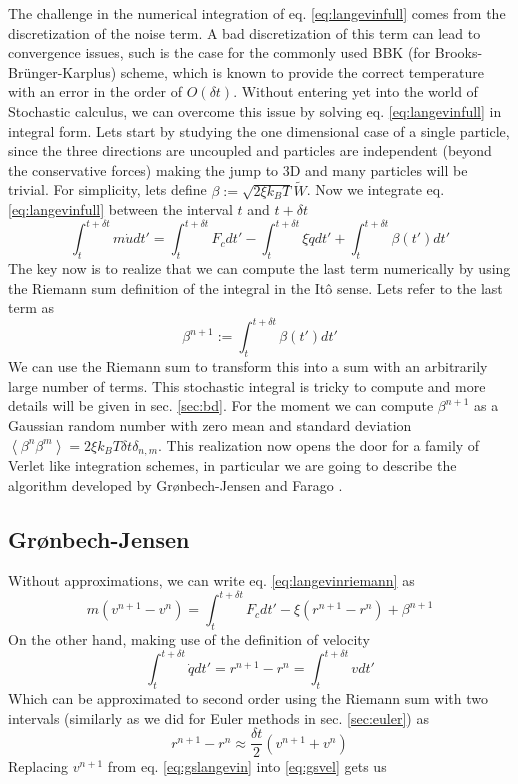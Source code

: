 \documentclass[ twoside,openright,titlepage,numbers=noenddot,%
headinclude,footinclude,cleardoublepage=empty,abstract=on,
BCOR=5mm,paper=a4,fontsize=11pt, dvipsnames
]{scrreprt}
\newcommand{\dt}{\delta t}
\newcommand{\kT}{k_B T}
\newcommand{\ppos}{q}
\newcommand{\pvel}{u}
\begin{document}
The challenge in the numerical integration of eq. \eqref{eq:langevinfull} comes from the discretization of the noise term.
A bad discretization of this term can lead to convergence issues, such is the case for the commonly used BBK (for Brooks-Brünger-Karplus) scheme\cite{Brunger1984}, which is known to provide the correct temperature with an error in the order of $O(\dt)$\cite{Wang2003}.
Without entering yet into the world of Stochastic calculus, we can overcome this issue by solving eq. \eqref{eq:langevinfull} in integral form. Lets start by studying the one dimensional case of a single particle, since the three directions are uncoupled and particles are independent (beyond the conservative forces) making the jump to 3D and many particles will be trivial. For simplicity, lets define $\beta := \sqrt{2\xi k_BT}\widetilde{W}$. Now we integrate eq. \eqref{eq:langevinfull} between the interval $t$ and $t+\dt$
\begin{equation}
  \label{eq:langevinriemann}
  \int_t^{t+\dt} m\dot{\pvel}dt' = \int_t^{t+\dt}F_c dt' - \int_t^{t+\dt}\xi\dot{\ppos}dt' + \int_t^{t+\dt}\beta(t')dt'
\end{equation}
The key now is to realize that we can compute the last term numerically by using the Riemann sum definition of the integral in the Itô sense. Lets refer to the last term as
\begin{equation}
  \label{eq:langenoisint}
  \beta^{n+1} := \int_t^{t+\dt}\beta(t')dt'
\end{equation}
We can use the Riemann sum to transform this into a sum with an arbitrarily large number of terms. This stochastic integral is tricky to compute and more details will be given in sec. \ref{sec:bd}. For the moment we can compute $\beta^{n+1}$ as a Gaussian random number with zero mean and standard deviation $\left\langle\beta^n\beta^m\right\rangle = 2\xi\kT\dt\delta_{n,m}$.
This realization now opens the door for a family of Verlet like integration schemes, in particular we are going to describe the algorithm developed by Grønbech-Jensen and Farago \cite{Gronbech2013}.

\subsection{Grønbech-Jensen}\label{sec:gronbechjensen}
Without approximations, we can write eq. \eqref{eq:langevinriemann} as
\begin{equation}
  \label{eq:gslangevin}
  m\left(v^{n+1}-v^n\right) = \int_t^{t+\dt}F_c dt' - \xi\left(r^{n+1}-r^n\right) + \beta^{n+1}
\end{equation}
On the other hand, making use of the definition of velocity
\begin{equation}
  \int_t^{t+\dt}\dot{\ppos}dt' = r^{n+1} - r^n = \int_t^{t+\dt}vdt'
\end{equation}
Which can be approximated to second order using the Riemann sum with two intervals (similarly as we did for Euler methods in sec. \ref{sec:euler}) as
\begin{equation}
  \label{eq:gsvel}
  r^{n+1} - r^n \approx \frac{\dt}{2}\left(v^{n+1}+v^n\right)
\end{equation}
Replacing $v^{n+1}$ from eq. \eqref{eq:gslangevin} into \eqref{eq:gsvel} gets us
\end{document}
